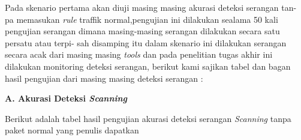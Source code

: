 		
		
		Pada skenario pertama akan diuji masing masing akurasi deteksi serangan tan-
		pa memasukan \emph{rule} traffik normal,pengujian ini dilakukan sealama 50 kali pengujian
		serangan dimana masing-masing serangan dilakukan secara satu persatu atau terpi-
		sah disamping itu dalam skenario ini dilakukan serangan secara acak dari masing masing \emph{tools} dan pada penelitian tugas akhir ini dilakukan monitoring deteksi 
		serangan, berikut kami sajikan tabel dan bagan hasil pengujian dari masing masing
		deteksi serangan :
		
		\newpage
		\noindent
		\textbf{A. Akurasi Deteksi \emph{Scanning}}
		
		Berikut adalah tabel hasil pengujian akurasi deteksi serangan \emph{Scanning} tanpa paket normal yang penulis dapatkan 
		
